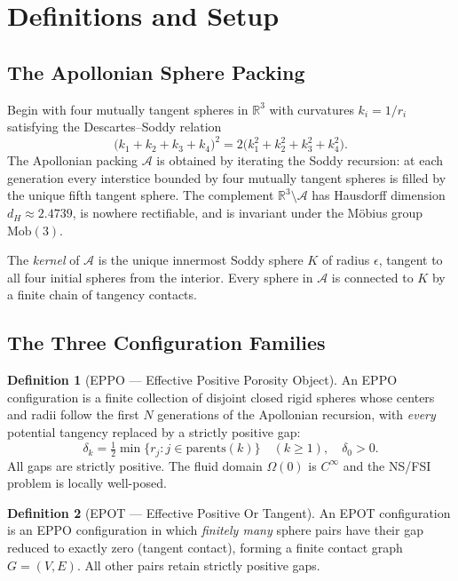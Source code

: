 \documentclass[11pt]{article}
\theoremstyle{plain}
\theoremstyle{definition}
\newtheorem{definition}{Definition}
\theoremstyle{remark}
\begin{document}
\section{Definitions and Setup}

\subsection{The Apollonian Sphere Packing}

Begin with four mutually tangent spheres in $\mathbb{R}^3$ with curvatures
$k_i = 1/r_i$ satisfying the Descartes--Soddy relation
\[
  \bigl(k_1+k_2+k_3+k_4\bigr)^2
  = 2\bigl(k_1^2+k_2^2+k_3^2+k_4^2\bigr).
\]
The Apollonian packing $\mathcal{A}$ is obtained by iterating the Soddy
recursion: at each generation every interstice bounded by four mutually
tangent spheres is filled by the unique fifth tangent sphere. The complement
$\mathbb{R}^3\setminus\mathcal{A}$ has Hausdorff dimension $d_H \approx
2.4739$, is nowhere rectifiable, and is invariant under the M\"{o}bius
group $\mathrm{Mob}(3)$.

The \emph{kernel} of $\mathcal{A}$ is the unique innermost Soddy sphere $K$
of radius $\epsilon$, tangent to all four initial spheres from the interior.
Every sphere in $\mathcal{A}$ is connected to $K$ by a finite chain of
tangency contacts.

\subsection{The Three Configuration Families}

\begin{definition}[EPPO --- Effective Positive Porosity Object]
An EPPO configuration is a finite collection of disjoint closed rigid
spheres whose centers and radii follow the first $N$ generations of the
Apollonian recursion, with \emph{every} potential tangency replaced by a
strictly positive gap:
\[
  \delta_k = \tfrac{1}{2}\min\bigl\{r_j : j \in \mathrm{parents}(k)\bigr\}
  \quad (k \geq 1), \quad \delta_0 > 0.
\]
All gaps are strictly positive. The fluid domain $\Omega(0)$ is $C^\infty$
and the NS/FSI problem is locally well-posed.
\end{definition}

\begin{definition}[EPOT --- Effective Positive Or Tangent]
An EPOT configuration is an EPPO configuration in which \emph{finitely
many} sphere pairs have their gap reduced to exactly zero (tangent contact),
forming a finite contact graph $G = (V,E)$. All other pairs retain strictly
positive gaps.
\end{definition}
\end{document}
